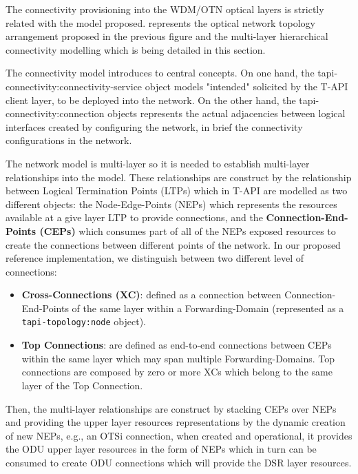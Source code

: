 \documentclass[a4paper,fleqn]{cas-dc}
\begin{document}
The connectivity provisioning into the WDM/OTN optical layers is strictly related with the model proposed.  represents the optical network topology arrangement proposed in the previous figure and the multi-layer hierarchical connectivity modelling which is being detailed in this section.

The connectivity model introduces to central concepts. On one hand, the tapi-connectivity:connectivity-service  object models "intended" solicited by the T-API client layer, to be deployed into the network. On the other hand, the tapi-connectivity:connection objects represents the actual adjacencies between logical interfaces created by configuring the network, in brief the connectivity configurations in the network. 

The network model is multi-layer so it is needed to establish multi-layer relationships into the model. These relationships are construct by the relationship between Logical Termination Points (LTPs) which in T-API are modelled as two different objects: the Node-Edge-Points (NEPs) which represents the resources available at a give layer LTP to provide connections, and the \textbf{Connection-End-Points (CEPs)} which consumes part of all of the NEPs exposed resources to create the connections between different points of the network. In our proposed reference implementation, we distinguish between two different level of connections:

\begin{itemize}
    \item \textbf{Cross-Connections (XC)}: defined as a connection between Connection-End-Points of the same layer within a Forwarding-Domain (represented as a\\ \texttt{tapi-topology:node} object). 
    \item \textbf{Top Connections}: are defined as end-to-end connections between CEPs within the same layer which may span multiple Forwarding-Domains. Top connections are composed by zero or more XCs which belong to the same layer of the Top Connection.
\end{itemize}

Then, the multi-layer relationships are construct by stacking CEPs over NEPs and providing the upper layer resources representations by the dynamic creation of new NEPs, e.g., an OTSi connection, when created and operational, it provides the ODU upper layer resources in the form of NEPs which in turn can be consumed to create ODU connections which will provide the DSR layer resources.
\end{document}
